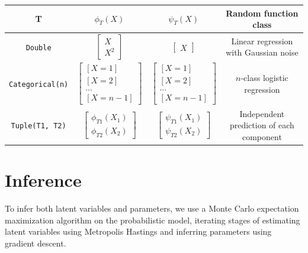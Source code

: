 \documentclass{article}
\begin{document}
    \begin{tabular}{| c | c | c | c|}
      \hline
      T & $\phi_T(X)$ & $\psi_T(X)$ & Random function class \\

      \hline
    \texttt{Double} & $\begin{bmatrix} X \\ X^2 \end{bmatrix}$ & $\begin{bmatrix} X \end{bmatrix}$ & Linear regression with Gaussian noise \\

      \hline
    \texttt{Categorical(n)} & $\begin{bmatrix} [X = 1] \\ [X = 2] \\ ...\\ [X = n-1] \end{bmatrix}$ & $\begin{bmatrix} [X = 1] \\ [X = 2] \\ ...\\ [X = n-1] \end{bmatrix}$ & $n$-class logistic regression \\

      \hline
    \texttt{Tuple(T1, T2)} & $\begin{bmatrix} \phi_{T1}(X_1) \\ \phi_{T2}(X_2) \end{bmatrix}$
                           & $\begin{bmatrix} \psi_{T1}(X_1) \\ \psi_{T2}(X_2) \end{bmatrix}$ &
      Independent prediction of each component
      \\
      \hline
    \end{tabular}



  \section{Inference}

    To infer both latent variables and parameters, we use a Monte Carlo
    expectation maximization algorithm \cite{mcem} on the probabilistic model, iterating stages of
    estimating latent variables using Metropolis Hastings and inferring
    parameters using gradient descent.
\end{document}
